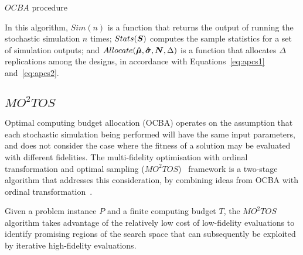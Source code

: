 \begin{algorithm}[h!] 
\caption{$OCBA$ procedure}
\label{alg:ocba}
{\footnotesize
\begin{algorithmic}[1]
 
 
 
\label{while-loop}
   
   
   
   
   
\ENDWHILE
\end{algorithmic}
}
\end{algorithm}

In this algorithm, $Sim(n)$ is a function that returns the output of running the stochastic simulation $n$ times; $Stats(\boldsymbol{S})$ computes the sample statistics for a set of simulation outputs; and $Allocate(\boldsymbol{\hat{\mu}},\boldsymbol{\hat{\sigma}},\boldsymbol{N},\Delta)$ is a function that allocates $\Delta$ replications among the designs, in accordance with Equations~\ref{eq:apcs1} and~\ref{eq:apcs2}.

\subsection{$MO^2TOS$}
Optimal computing budget allocation (OCBA) operates on the assumption that each stochastic simulation being performed will have the same input parameters, and does not consider the case where the fitness of a solution may be evaluated with different fidelities. The multi-fidelity optimisation with ordinal transformation and optimal sampling ($MO^2TOS$)~\cite{xu2016mo2tos} framework is a two-stage algorithm that addresses this consideration, by combining ideas from OCBA with ordinal transformation~\cite{xu2014ordinal}.

Given a problem instance $P$ and a finite computing budget $T$, the $MO^2TOS$ algorithm takes advantage of the relatively low cost of low-fidelity evaluations to identify promising regions of the search space that can subsequently be exploited by iterative high-fidelity evaluations.

